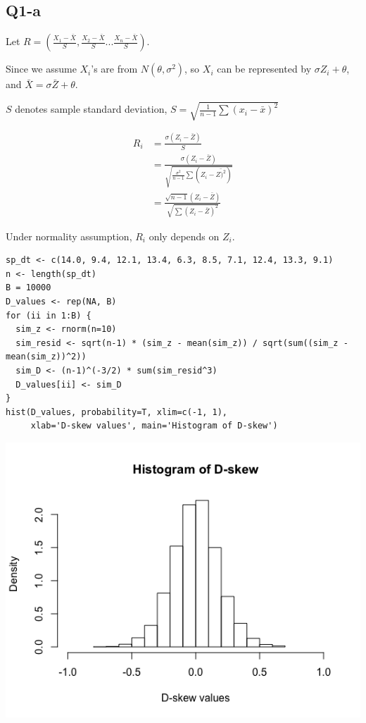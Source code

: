 \documentclass[11pt,letterpaper]{article}
\begin{document}
\subsection*{Q1-a}
\noindent Let $R = (\frac{X_1 - \bar{X}}{S}, \frac{X_2 - \bar{X}}{S}... \frac{X_n - \bar{X}}{S})$. 

\noindent Since we assume $X_i$'s are from $N(\theta, \sigma^2)$, so $X_i$ can be represented by $\sigma Z_i + \theta$, and $\bar{X} = \sigma \bar{Z} + \theta$.

\noindent $S$ denotes sample standard deviation, $S = \sqrt{\frac{1}{n-1} \sum (x_i - \bar{x})^2}$ 

\begin{align*}
R_i &= \frac{\sigma(Z_i - \bar{Z})}{S} \\
&= \frac{\sigma(Z_i - \bar{Z})}{\sqrt{\frac{\sigma^2}{n-1} \sum (Z_i - \bar{Z)^2})}} \\
&= \frac{\sqrt{n-1} (Z_i - \bar{Z})}{\sqrt{\sum (Z_i - \bar{Z})^2}}
\end{align*}

\noindent Under normality assumption, $R_i$ only depends on $Z_i$.

\begin{verbatim}
sp_dt <- c(14.0, 9.4, 12.1, 13.4, 6.3, 8.5, 7.1, 12.4, 13.3, 9.1)
n <- length(sp_dt)
B = 10000
D_values <- rep(NA, B)
for (ii in 1:B) {
  sim_z <- rnorm(n=10) 
  sim_resid <- sqrt(n-1) * (sim_z - mean(sim_z)) / sqrt(sum((sim_z - mean(sim_z))^2))
  sim_D <- (n-1)^(-3/2) * sum(sim_resid^3)
  D_values[ii] <- sim_D
}
hist(D_values, probability=T, xlim=c(-1, 1), 
     xlab='D-skew values', main='Histogram of D-skew')
\end{verbatim}

\includegraphics[scale=0.55]{q1-a.png}
\end{document}
